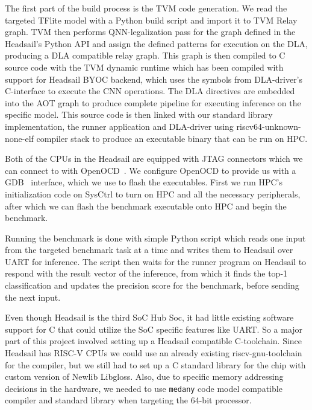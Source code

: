 \documentclass[12pt,a4paper,english
]{tunithesis}
\begin{document}
The first part of the build process is the TVM code generation. We read the targeted TFlite model with a Python build script and import it to TVM Relay graph.
TVM then performs QNN-legalization pass for the graph defined in the Headsail's Python API and assign the defined patterns for execution on the DLA, producing a DLA compatible relay graph.
This graph is then compiled to C source code with the TVM dynamic runtime which has been compiled with support for Headsail BYOC backend, which uses the symbols from DLA-driver's C-interface to execute the CNN operations. The DLA directives are embedded into the AOT graph to produce complete pipeline for executing inference on the specific model. This source code is then linked with our standard library implementation, the runner application and DLA-driver using riscv64-unknown-none-elf compiler stack to produce an executable binary that can be run on HPC.

Both of the CPUs in the Headsail are equipped with JTAG connectors which we can connect to with OpenOCD~\cite{openocd2023}. We configure OpenOCD to provide us with a GDB~\cite{gdb2023} interface, which we use to flash the executables. First we run HPC's initialization code on SysCtrl to turn on HPC and all the necessary peripherals, after which we can flash the benchmark executable onto HPC and begin the benchmark.

Running the benchmark is done with simple Python script which reads one input from the targeted benchmark task at a time and writes them to Headsail over UART for inference.
The script then waits for the runner program on Headsail to respond with the result vector of the inference, from which it finds the top-1 classification and updates the precision score for the benchmark, before sending the next input.

Even though Headsail is the third SoC Hub Soc, it had little existing software support for C that could utilize the SoC specific features like UART. So a major part of this project involved setting up a Headsail compatible C-toolchain. Since Headsail has RISC-V CPUs we could use an already existing riscv-gnu-toolchain for the compiler, but we still had to set up a C standard library for the chip with custom version of Newlib Libgloss. Also, due to specific memory addressing decisions in the hardware, we needed to use \texttt{medany} code model compatible compiler and standard library when targeting the 64-bit processor.
\end{document}
